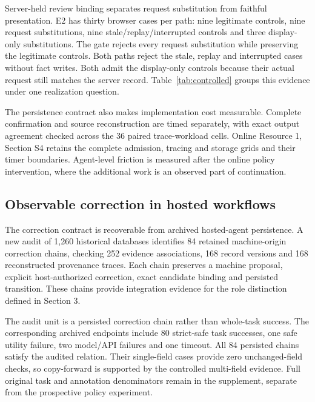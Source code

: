 \documentclass[10pt,a4paper,twocolumn]{article}
\begin{document}
Server-held review binding separates request substitution from faithful presentation. E2 has thirty browser cases per path: nine legitimate controls, nine request substitutions, nine stale/replay/interrupted controls and three display-only substitutions. The gate rejects every request substitution while preserving the legitimate controls. Both paths reject the stale, replay and interrupted cases without fact writes. Both admit the display-only controls because their actual request still matches the server record. Table~\ref{tab:controlled} groups this evidence under one realization question.

The persistence contract also makes implementation cost measurable. Complete confirmation and source reconstruction are timed separately, with exact output agreement checked across the 36 paired trace-workload cells. Online Resource 1, Section S4 retains the complete admission, tracing and storage grids and their timer boundaries. Agent-level friction is measured after the online policy intervention, where the additional work is an observed part of continuation.

\subsection{Observable correction in hosted workflows}
The correction contract is recoverable from archived hosted-agent persistence. A new audit of 1,260 historical databases identifies 84 retained machine-origin correction chains, checking 252 evidence associations, 168 record versions and 168 reconstructed provenance traces. Each chain preserves a machine proposal, explicit host-authorized correction, exact candidate binding and persisted transition. These chains provide integration evidence for the role distinction defined in Section 3.

The audit unit is a persisted correction chain rather than whole-task success. The corresponding archived endpoints include 80 strict-safe task successes, one safe utility failure, two model/API failures and one timeout. All 84 persisted chains satisfy the audited relation. Their single-field cases provide zero unchanged-field checks, so copy-forward is supported by the controlled multi-field evidence. Full original task and annotation denominators remain in the supplement, separate from the prospective policy experiment.
\end{document}

